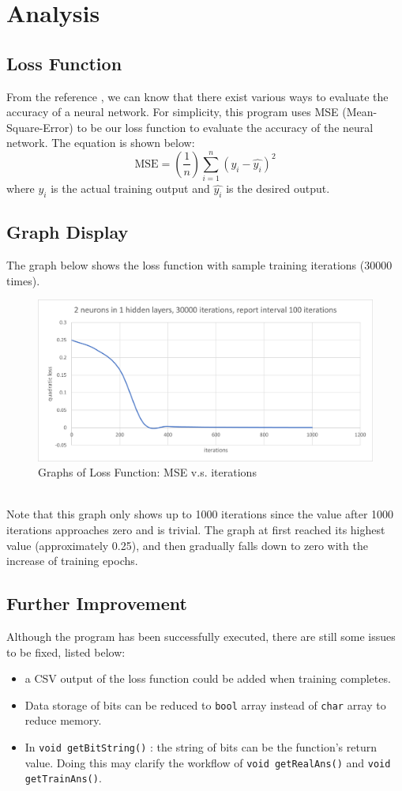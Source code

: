 \section{Analysis}
		\subsection{Loss Function}
	From the reference \cite{ref3}, we can know that there exist various ways to evaluate the accuracy of a neural network. For simplicity, this program uses MSE (Mean-Square-Error) to be our loss function to evaluate the accuracy of the neural network. The equation is shown below:
	\begin{equation}
	    \textrm{MSE} = (\frac{1}{n})\sum_{i=1}^{n}\left(y_i - \hat{y_i}\right)^2  
	\end{equation}
	where $y_i$ is the actual training output and $\hat{y_i}$ is the desired output.   
	\subsection{Graph Display}
	The graph below shows the loss function with sample training iterations (30000 times). 
	\begin{figure}[h]
	    \centering
	    \includegraphics[width=1\textwidth]{image/2in1.png}
	    \caption{Graphs of Loss Function: MSE v.s. iterations}
	    \label{fig:my_label}
	\end{figure}
	\\Note that this graph only shows up to 1000 iterations since the value after 1000 iterations approaches zero and is trivial. The graph at first reached its highest value (approximately 0.25), and then gradually falls down to zero with the increase of training epochs. 
	\subsection{Further Improvement}
	Although the program has been successfully executed, there are still some issues to be fixed, listed below:
	\begin{itemize}
	    \item a CSV output of the loss function could be added when training completes.
	    \item Data storage of bits can be reduced to \lstinline{bool} array instead of \lstinline{char} array to reduce memory. 
	    \item In \lstinline{void getBitString()} : the string of bits can be the function's return value. Doing this may clarify the workflow of  \lstinline{void getRealAns()} and \lstinline{void getTrainAns()}. 
	\end{itemize}